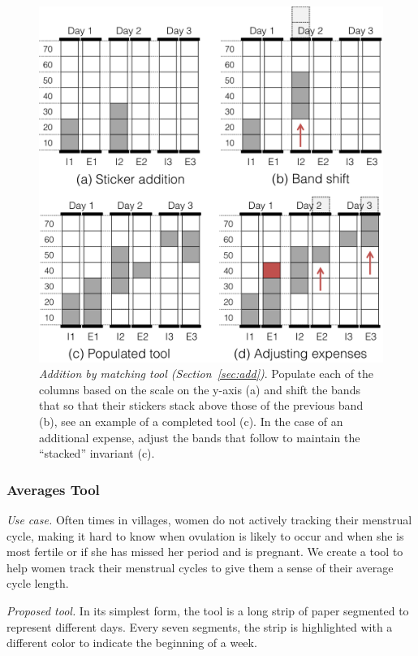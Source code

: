 \documentclass{sig-alternate}
\begin{document}
\begin{figure}
\centering
\includegraphics[width=.9\linewidth]{img/add.png}
\caption{\emph{Addition by matching tool (Section~\ref{sec:add})}. Populate each of the columns based on the scale on the y-axis (a) and shift the bands that so that their stickers stack above those of the previous band (b), see an example of a completed tool (c). In the case of an additional expense, adjust the bands that follow to maintain the ``stacked'' invariant (c).}
\label{fig:add}
\end{figure}

\subsubsection{Averages Tool}
\label{sec:average}

\emph{Use case.} 
Often times in villages, women do not actively tracking their menstrual cycle, making it hard to know when ovulation is likely to occur and when she is most fertile or if she has missed her period and is pregnant. We create a tool to help women track their menstrual cycles to give them a sense of their average cycle length.

\emph{Proposed tool.}
In its simplest form, the tool is a long strip of paper segmented to represent different days. Every seven segments, the strip is highlighted with a different color to indicate the beginning of a week.
\end{document}
